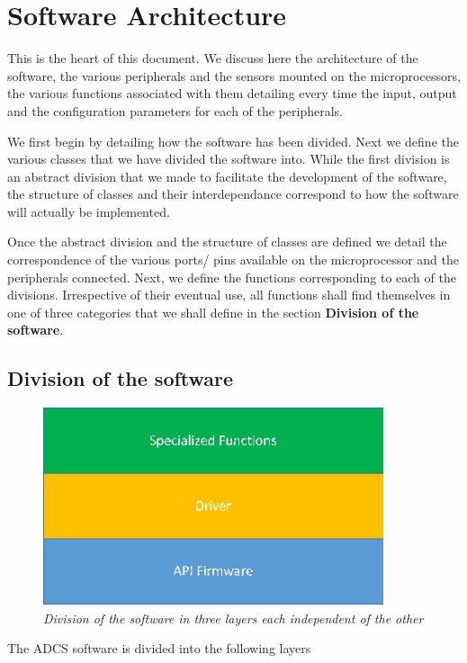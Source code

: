 \documentclass[11pt,a4paper]{report}
\begin{document}
\chapter{Software Architecture} \thispagestyle{fancy}
This is the heart of this document. We discuss here the architecture of the software, the various peripherals and the sensors mounted on the microprocessors, the various functions associated with them detailing every time the input, output and the configuration parameters for each of the peripherals. 

We first begin by detailing how the software has been divided. Next we define the various classes that we have divided the software into. While the first division is an abstract division that we made to facilitate the development of the software, the structure of classes and their interdependance correspond to how the software will actually be implemented. 

Once the abstract division and the structure of classes are defined we detail the correspondence of the various ports/ pins available on the microprocessor and the peripherals connected. Next, we define the functions corresponding to each of the divisions. Irrespective of their eventual use, all functions shall find themselves in one of three categories that we shall define in the section \textbf{Division of the software}. 


\section{Division of the software} 

\begin{figure}[!h]
\centering 
\includegraphics[width=10cm]{arch_layers.jpg}
\caption{\textit{Division of the software in three layers each independent of the other}}
\label{layers_arch_soft}
\end{figure}
 
The ADCS software is divided into the following layers 
\end{document}
